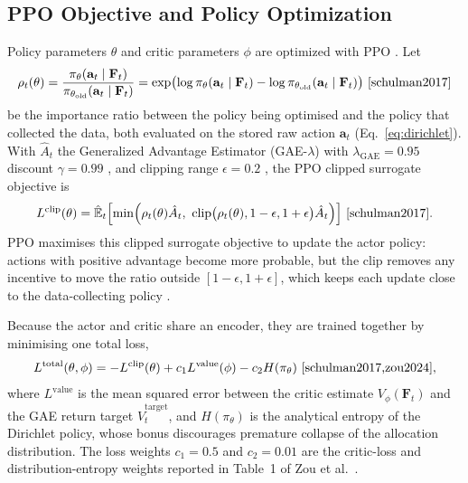 \documentclass[11pt,a4paper]{article}
\numberwithin{equation}{section}
\numberwithin{table}{section}
\numberwithin{figure}{section}
\numberwithin{algorithm}{section}
\newcommand{\E}{\hat{\mathbb{E}}}
\newcommand{\F}{\mathbf{F}}
\newcommand{\ba}{\mathbf{a}}
\begin{document}
\subsection{PPO Objective and Policy Optimization}
Policy parameters $\theta$ and critic parameters $\phi$ are optimized with PPO \cite{schulman2017}. Let
\begin{equation}
\rho_t(\theta)=\frac{\pi_\theta(\ba_t\mid\F_t)}{\pi_{\theta_{\mathrm{old}}}(\ba_t\mid\F_t)}=\exp\bigl(\log\pi_\theta(\ba_t\mid\F_t)-\log\pi_{\theta_{\mathrm{old}}}(\ba_t\mid\F_t)\bigr)\ \cite{schulman2017}\label{eq:ratio}
\end{equation}
be the importance ratio between the policy being optimised and the policy that collected the data, both evaluated on the stored raw action $\ba_t$ (Eq.~\eqref{eq:dirichlet}). With $\hat A_t$ the Generalized Advantage Estimator (GAE-$\lambda$) with $\lambda_{\mathrm{GAE}}=0.95$ discount $\gamma=0.99$ \cite{zou2024}, and clipping range $\epsilon=0.2$ \cite{schulman2017,zou2024}, the PPO clipped surrogate objective \cite{schulman2017} is
\begin{equation}
L^{\mathrm{clip}}(\theta)=\E_t\Bigl[\min\Bigl(\rho_t(\theta)\hat A_t,\ \mathrm{clip}\bigl(\rho_t(\theta),1-\epsilon,1+\epsilon\bigr)\hat A_t\Bigr)\Bigr]\ \cite{schulman2017}.\label{eq:clip}
\end{equation}
PPO maximises this clipped surrogate objective to update the actor policy: actions with positive advantage become more probable, but the clip removes any incentive to move the ratio outside $[1-\epsilon,1+\epsilon]$, which keeps each update close to the data-collecting policy \cite{schulman2017}.

Because the actor and critic share an encoder, they are trained together by minimising one total loss,
\begin{equation}
L^{\mathrm{total}}(\theta,\phi)=-L^{\mathrm{clip}}(\theta)+c_1L^{\mathrm{value}}(\phi)-c_2H(\pi_\theta)\ \cite{schulman2017,zou2024},\label{eq:total}
\end{equation}
where $L^{\mathrm{value}}$ is the mean squared error between the critic estimate $V_\phi(\F_t)$ and the GAE return target $\hat V_t^{\mathrm{target}}$, and $H(\pi_\theta)$ is the analytical entropy of the Dirichlet policy, whose bonus discourages premature collapse of the allocation distribution. The loss weights $c_1=0.5$ and $c_2=0.01$ are the critic-loss and distribution-entropy weights reported in Table~1 of Zou et al.\ \cite{zou2024}.
\end{document}
